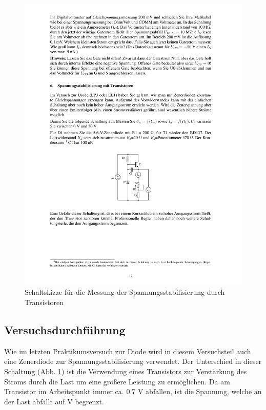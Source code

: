 \documentclass[12pt,a4paper]{article}
\begin{document}
\begin{figure}[H] 
  \centering
    \includegraphics[trim = 10mm 80mm 10mm 140mm, clip, scale = 1]{ep3_14[Page17].pdf}
  	\caption[Schaltskizze für die Messung der Spannungsstabilisierung durch Transistoren]{Schaltskizze für die Messung der Spannungsstabilisierung durch Transistoren\footnotemark}
  \label{fig:8}
\end{figure}

\subsection{Versuchsdurchführung}
Wie im letzten Praktikumsversuch zur Diode wird in diesem Versuchsteil auch eine Zenerdiode zur Spannungsstabilisierung verwendet. Der Unterschied in dieser Schaltung (Abb. \ref{fig:8}) ist die Verwendung eines Transistors zur Verstärkung des Stroms durch die Last um eine größere Leistung zu ermöglichen. Da am Transistor im Arbeitspunkt immer ca. 0.7 V abfallen, ist die Spannung, welche an der Last abfällt auf \unit[5]{V} begrenzt.
\end{document}
